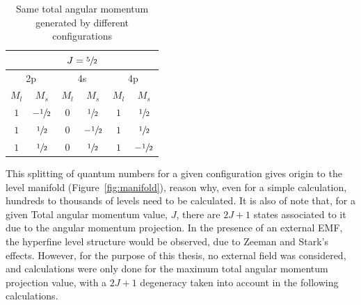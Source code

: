 \begin{table}[h!]
    \centering
    \caption{Same total angular momentum generated by different configurations}\label{tab:epsilon}
    \begin{tabular}{cc| cc | cc}
        \toprule\multicolumn{6}{c}{$J=\sfrac{5}{2}$}\\\midrule
        \multicolumn{2}{c|}{2p}&\multicolumn{2}{c|}{4s}&\multicolumn{2}{c}{4p}\\
        $M_l$ & $M_s$ & $M_l$&$M_s$&$M_l$&$M_s$\\\midrule
        $1$&$-\sfrac{1}{2}$&$0$&$\sfrac{1}{2}$&$1$&$\sfrac{1}{2}$\\
        $1$&$\sfrac{1}{2}$&$0$&$-\sfrac{1}{2}$&$1$&$\sfrac{1}{2}$\\
        $1$&$\sfrac{1}{2}$&$0$&$\sfrac{1}{2}$&$1$&$-\sfrac{1}{2}$\\\bottomrule
    \end{tabular}
\end{table}

This splitting of quantum numbers for a given configuration gives origin to the level manifold (Figure~\ref{fig:manifold}), reason why, even for a simple calculation, hundreds to thousands of levels need to be calculated. It is also of note that, for a given Total angular momentum value, $J$, there are $2J+1$ states associated to it due to the angular momentum projection. In the presence of an external \gls{EMF}, the hyperfine level structure would be observed, due to Zeeman and Stark's effects. However, for the purpose of this thesis, no external field was considered, and calculations were only done for the maximum total angular momentum projection value, with a $2J+1$ degeneracy taken into account in the following calculations.

